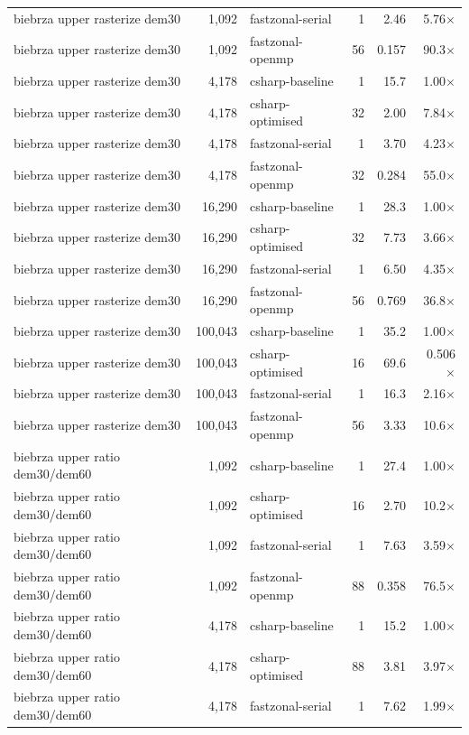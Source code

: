 \begin{tabular}{lrlrrr}
biebrza upper rasterize dem30 & 1,092 & fastzonal-serial & 1 & 2.46 & 5.76$\times$ \\
biebrza upper rasterize dem30 & 1,092 & fastzonal-openmp & 56 & 0.157 & 90.3$\times$ \\
biebrza upper rasterize dem30 & 4,178 & csharp-baseline & 1 & 15.7 & 1.00$\times$ \\
biebrza upper rasterize dem30 & 4,178 & csharp-optimised & 32 & 2.00 & 7.84$\times$ \\
biebrza upper rasterize dem30 & 4,178 & fastzonal-serial & 1 & 3.70 & 4.23$\times$ \\
biebrza upper rasterize dem30 & 4,178 & fastzonal-openmp & 32 & 0.284 & 55.0$\times$ \\
biebrza upper rasterize dem30 & 16,290 & csharp-baseline & 1 & 28.3 & 1.00$\times$ \\
biebrza upper rasterize dem30 & 16,290 & csharp-optimised & 32 & 7.73 & 3.66$\times$ \\
biebrza upper rasterize dem30 & 16,290 & fastzonal-serial & 1 & 6.50 & 4.35$\times$ \\
biebrza upper rasterize dem30 & 16,290 & fastzonal-openmp & 56 & 0.769 & 36.8$\times$ \\
biebrza upper rasterize dem30 & 100,043 & csharp-baseline & 1 & 35.2 & 1.00$\times$ \\
biebrza upper rasterize dem30 & 100,043 & csharp-optimised & 16 & 69.6 & 0.506$\times$ \\
biebrza upper rasterize dem30 & 100,043 & fastzonal-serial & 1 & 16.3 & 2.16$\times$ \\
biebrza upper rasterize dem30 & 100,043 & fastzonal-openmp & 56 & 3.33 & 10.6$\times$ \\
biebrza upper ratio dem30/dem60 & 1,092 & csharp-baseline & 1 & 27.4 & 1.00$\times$ \\
biebrza upper ratio dem30/dem60 & 1,092 & csharp-optimised & 16 & 2.70 & 10.2$\times$ \\
biebrza upper ratio dem30/dem60 & 1,092 & fastzonal-serial & 1 & 7.63 & 3.59$\times$ \\
biebrza upper ratio dem30/dem60 & 1,092 & fastzonal-openmp & 88 & 0.358 & 76.5$\times$ \\
biebrza upper ratio dem30/dem60 & 4,178 & csharp-baseline & 1 & 15.2 & 1.00$\times$ \\
biebrza upper ratio dem30/dem60 & 4,178 & csharp-optimised & 88 & 3.81 & 3.97$\times$ \\
biebrza upper ratio dem30/dem60 & 4,178 & fastzonal-serial & 1 & 7.62 & 1.99$\times$ \\

\end{tabular}
